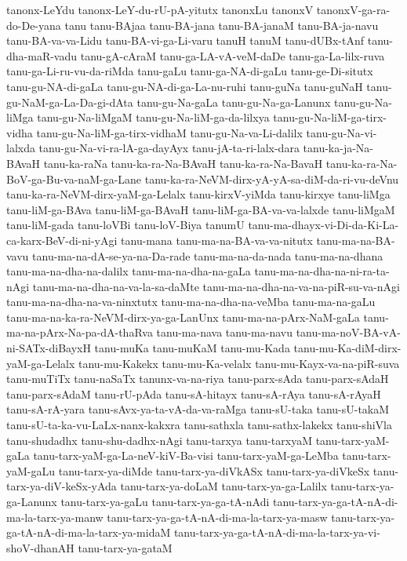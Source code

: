 {tanonx-LeYdu
tanonx-LeY-du-rU-pA-yitutx
tanonxLu
tanonxV
tanonxV-ga-ra-do-De-yana
tanu
tanu-BAjaa
tanu-BA-jana
tanu-BA-janaM
tanu-BA-ja-navu
tanu-BA-va-va-Lidu
tanu-BA-vi-ga-Li-varu
tanuH
tanuM
tanu-dUBx-tAnf
tanu-dha-maR-vadu
tanu-gA-cAraM
tanu-ga-LA-vA-veM-daDe
tanu-ga-La-lilx-ruva
tanu-ga-Li-ru-vu-da-riMda
tanu-gaLu
tanu-ga-NA-di-gaLu
tanu-ge-Di-situtx
tanu-gu-NA-di-gaLa
tanu-gu-NA-di-ga-La-nu-ruhi
tanu-guNa
tanu-guNaH
tanu-gu-NaM-ga-La-Da-gi-dAta
tanu-gu-Na-gaLa
tanu-gu-Na-ga-Lanunx
tanu-gu-Na-liMga
tanu-gu-Na-liMgaM
tanu-gu-Na-liM-ga-da-lilxya
tanu-gu-Na-liM-ga-tirx-vidha
tanu-gu-Na-liM-ga-tirx-vidhaM
tanu-gu-Na-va-Li-dalilx
tanu-gu-Na-vi-lalxda
tanu-gu-Na-vi-ra-lA-ga-dayAyx
tanu-jA-ta-ri-lalx-dara
tanu-ka-ja-Na-BAvaH
tanu-ka-raNa
tanu-ka-ra-Na-BAvaH
tanu-ka-ra-Na-BavaH
tanu-ka-ra-Na-BoV-ga-Bu-va-naM-ga-Lane
tanu-ka-ra-NeVM-dirx-yA-yA-sa-diM-da-ri-vu-deVnu
tanu-ka-ra-NeVM-dirx-yaM-ga-Lelalx
tanu-kirxV-yiMda
tanu-kirxye
tanu-liMga
tanu-liM-ga-BAva
tanu-liM-ga-BAvaH
tanu-liM-ga-BA-va-va-lalxde
tanu-liMgaM
tanu-liM-gada
tanu-loVBi
tanu-loV-Biya
tanumU
tanu-ma-dhayx-vi-Di-da-Ki-La-ca-karx-BeV-di-ni-yAgi
tanu-mana
tanu-ma-na-BA-va-va-nitutx
tanu-ma-na-BA-vavu
tanu-ma-na-dA-se-ya-na-Da-rade
tanu-ma-na-da-nada
tanu-ma-na-dhana
tanu-ma-na-dha-na-dalilx
tanu-ma-na-dha-na-gaLa
tanu-ma-na-dha-na-ni-ra-ta-nAgi
tanu-ma-na-dha-na-va-la-sa-daMte
tanu-ma-na-dha-na-va-na-piR-su-va-nAgi
tanu-ma-na-dha-na-va-ninxtutx
tanu-ma-na-dha-na-veMba
tanu-ma-na-gaLu
tanu-ma-na-ka-ra-NeVM-dirx-ya-ga-LanUnx
tanu-ma-na-pArx-NaM-gaLa
tanu-ma-na-pArx-Na-pa-dA-thaRva
tanu-ma-nava
tanu-ma-navu
tanu-ma-noV-BA-vA-ni-SATx-diBayxH
tanu-muKa
tanu-muKaM
tanu-mu-Kada
tanu-mu-Ka-diM-dirx-yaM-ga-Lelalx
tanu-mu-Kakekx
tanu-mu-Ka-velalx
tanu-mu-Kayx-va-na-piR-suva
tanu-muTiTx
tanu-naSaTx
tanunx-va-na-riya
tanu-parx-sAda
tanu-parx-sAdaH
tanu-parx-sAdaM
tanu-rU-pAda
tanu-sA-hitayx
tanu-sA-rAya
tanu-sA-rAyaH
tanu-sA-rA-yara
tanu-sAvx-ya-ta-vA-da-va-raMga
tanu-sU-taka
tanu-sU-takaM
tanu-sU-ta-ka-vu-LaLx-nanx-kakxra
tanu-sathxla
tanu-sathx-lakekx
tanu-shiVla
tanu-shudadhx
tanu-shu-dadhx-nAgi
tanu-tarxya
tanu-tarxyaM
tanu-tarx-yaM-gaLa
tanu-tarx-yaM-ga-La-neV-kiV-Ba-visi
tanu-tarx-yaM-ga-LeMba
tanu-tarx-yaM-gaLu
tanu-tarx-ya-diMde
tanu-tarx-ya-diVkASx
tanu-tarx-ya-diVkeSx
tanu-tarx-ya-diV-keSx-yAda
tanu-tarx-ya-doLaM
tanu-tarx-ya-ga-Lalilx
tanu-tarx-ya-ga-Lanunx
tanu-tarx-ya-gaLu
tanu-tarx-ya-ga-tA-nAdi
tanu-tarx-ya-ga-tA-nA-di-ma-la-tarx-ya-manw
tanu-tarx-ya-ga-tA-nA-di-ma-la-tarx-ya-masw
tanu-tarx-ya-ga-tA-nA-di-ma-la-tarx-ya-midaM
tanu-tarx-ya-ga-tA-nA-di-ma-la-tarx-ya-vi-shoV-dhanAH
tanu-tarx-ya-gataM
}
